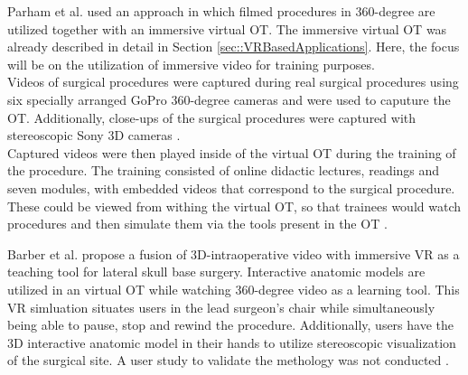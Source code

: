 Parham et al. \cite{Parham.2019} used an approach in which filmed procedures in 360-degree are utilized together with an immersive virtual OT.
The immersive virtual OT was already described in detail in Section \ref{sec::VRBasedApplications}. Here, the focus will be on the utilization of immersive 
video for training purposes.
\\ Videos of surgical procedures were captured during real surgical procedures using six specially arranged GoPro 360-degree cameras and were used to caputure the OT.
Additionally, close-ups of the surgical procedures were captured with stereoscopic Sony 3D cameras \cite{Parham.2019}.
\\ Captured videos were then played inside of the virtual OT during the training of the procedure.
The training consisted of online didactic lectures, readings and seven modules, with embedded videos that correspond to the surgical procedure.
These could be viewed from withing the virtual OT, so that trainees would watch procedures and then simulate them via the tools present in the OT \cite{Parham.2019}.

Barber et al. \cite{Barber.2020} propose a fusion of 3D-intraoperative 
video with immersive VR as a teaching tool for lateral skull base surgery.
Interactive anatomic models are utilized in an virtual OT while watching 
360-degree video as a learning tool.
This VR simluation situates users in the lead surgeon's chair while 
simultaneously being able to pause, stop and rewind the procedure.
Additionally, users have the 3D interactive anatomic model in their 
hands to utilize stereoscopic visualization of the surgical 
site. A user study to validate the 
methology was not conducted \cite{Barber.2020}.

